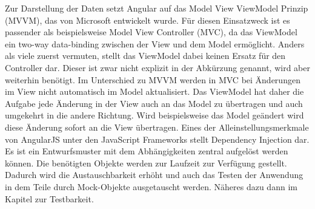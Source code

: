 Zur Darstellung der Daten setzt Angular auf das Model View ViewModel
Prinzip (MVVM), das von Microsoft entwickelt wurde. Für diesen
Einsatzweck ist es passender als beispielsweise Model View Controller
(MVC), da das ViewModel ein two-way data-binding zwischen der View und
dem Model ermöglicht. Anders als viele zuerst vermuten, stellt das
ViewModel dabei keinen Ersatz für den Controller dar. Dieser ist zwar
nicht explizit in der Abkürzung genannt, wird aber weiterhin benötigt.
Im Unterschied zu MVVM werden in MVC bei Änderungen im View nicht
automatisch im Model aktualisiert. Das ViewModel hat daher die Aufgabe
jede Änderung in der View auch an das Model zu übertragen und auch
umgekehrt in die andere Richtung. Wird beispielsweise das Model geändert
wird diese Änderung sofort an die View übertragen. Eines der
Alleinstellungsmerkmale von AngularJS unter den JavaScript Frameworks
stellt Dependency Injection dar. Es ist ein Entwurfsmuster mit dem
Abhängigkeiten zentral aufgelöst werden können. Die benötigten Objekte
werden zur Laufzeit zur Verfügung gestellt. Dadurch wird die
Austauschbarkeit erhöht und auch das Testen der Anwendung in dem Teile
durch Mock-Objekte ausgetauscht werden. Näheres dazu dann im Kapitel zur
Testbarkeit.

